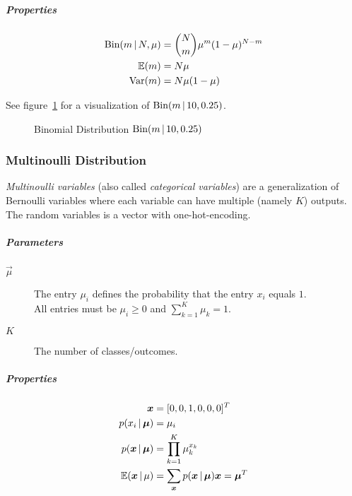 				\subparagraph{Properties}
					\begin{align}
						\textrm{Bin}(m \,\vert\, N, \mu) & = { N \choose m } \mu^m (1 - \mu)^{N - m} \\
						\mathbb{E}(m)                         & = N\mu                                    \\
						\operatorname{Var}(m)                       & = N \mu (1 - \mu)
					\end{align}

					See figure~\ref{fig:binomialDistribution} for a visualization of \( \textrm{Bin}(m \,\vert\, 10, 0.25) \).

					\begin{figure}
						\centering
						\caption{Binomial Distribution \( \textrm{Bin}(m \,\vert\, 10, 0.25) \)}
						\label{fig:binomialDistribution}
					\end{figure}

			\subsubsection{Multinoulli Distribution}
				\emph{Multinoulli variables} (also called \emph{categorical variables}) are a generalization of Bernoulli variables where each variable can have multiple (namely \(K\)) outputs. The random variables is a vector with one-hot-encoding.

				\subparagraph{Parameters}
					\begin{description}
						\item[\(\vec{\mu}\)] The entry \(\mu_i\) defines the probability that the entry \(x_i\) equals \(1\). \\ All entries must be \( \mu_i \geq 0 \) and \( \sum_{k = 1}^{K} \mu_k = 1 \).
						\item [\(K\)] The number of classes/outcomes.
					\end{description}

				\subparagraph{Properties}
					\begin{align}
						\bm{x}                     & = [ 0, 0, 1, 0, 0, 0 ]^T                                           \\
						p(x_i \,\vert\, \bm{\mu})     & = \mu_i                                                            \\
						p(\bm{x} \,\vert\, \bm{\mu}) & = \prod_{k = 1}^{K} \mu_k^{x_k}                                    \\
						\mathbb{E}(\bm{x} \,\vert\, \mu)      & = \sum_{\bm{x}} p(\bm{x} \,\vert\, \bm{\mu}) \bm{x} = \bm{\mu}^T
					\end{align}


